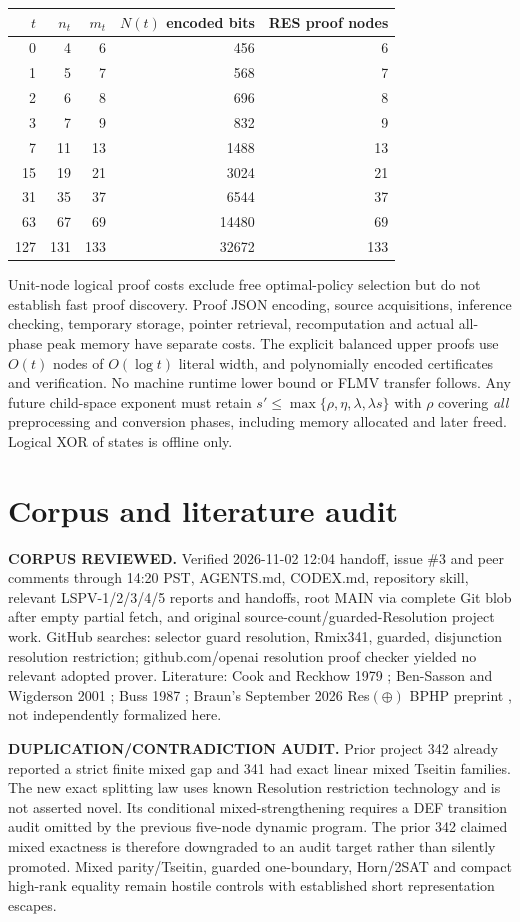 \documentclass[11pt]{article}
\begin{document}
\begin{center}
\begin{tabular}{rrrrr}
\toprule
$t$&$n_t$&$m_t$&$N(t)$ encoded bits&RES proof nodes\\
\midrule
0&4&6&456&6\\
1&5&7&568&7\\
2&6&8&696&8\\
3&7&9&832&9\\
7&11&13&1488&13\\
15&19&21&3024&21\\
31&35&37&6544&37\\
63&67&69&14480&69\\
127&131&133&32672&133\\
\bottomrule
\end{tabular}
\end{center}
Unit-node logical proof costs exclude free optimal-policy selection but do not establish fast proof discovery. Proof JSON encoding, source acquisitions, inference checking, temporary storage, pointer retrieval, recomputation and actual all-phase peak memory have separate costs. The explicit balanced upper proofs use $O(t)$ nodes of $O(\log t)$ literal width, and polynomially encoded certificates and verification. No machine runtime lower bound or FLMV transfer follows. Any future child-space exponent must retain $s'\le\max\{\rho,\eta,\lambda,\lambda s\}$ with $\rho$ covering \emph{all} preprocessing and conversion phases, including memory allocated and later freed. Logical XOR of states is offline only.

\section*{Corpus and literature audit}
\textbf{CORPUS REVIEWED.} Verified 2026-11-02 12:04 handoff, issue \#3 and peer comments through 14:20 PST, AGENTS.md, CODEX.md, repository skill, relevant LSPV-1/2/3/4/5 reports and handoffs, root MAIN via complete Git blob after empty partial fetch, and original source-count/guarded-Resolution project work. GitHub searches: selector guard resolution, Rmix341, guarded, disjunction resolution restriction; github.com/openai resolution proof checker yielded no relevant adopted prover. Literature: Cook and Reckhow 1979 \cite{CookReckhow}; Ben-Sasson and Wigderson 2001 \cite{BenSassonWigderson}; Buss 1987 \cite{Buss}; Braun's September 2026 Res$(\oplus)$ BPHP preprint \cite{Braun}, not independently formalized here.

\textbf{DUPLICATION/CONTRADICTION AUDIT.} Prior project 342 already reported a strict finite mixed gap and 341 had exact linear mixed Tseitin families. The new exact splitting law uses known Resolution restriction technology and is not asserted novel. Its conditional mixed-strengthening requires a DEF transition audit omitted by the previous five-node dynamic program. The prior 342 claimed mixed exactness is therefore downgraded to an audit target rather than silently promoted. Mixed parity/Tseitin, guarded one-boundary, Horn/2SAT and compact high-rank equality remain hostile controls with established short representation escapes.
\end{document}
